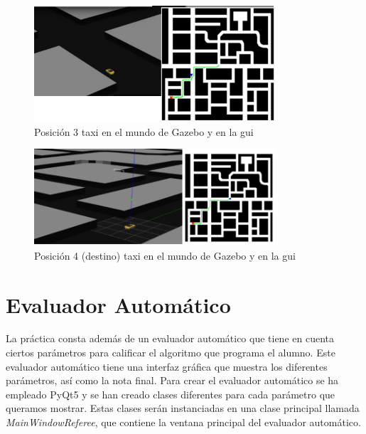 \begin{figure}[H]
  \begin{center}
    \includegraphics[width=0.8\textwidth]{figures/GPP/camino3_G.png}
		\caption{Posición 3 taxi en el mundo de Gazebo y en la \acrshort{gui}}
		\label{fig.camino3_G_gpp}
		\end{center}
\end{figure}

\begin{figure}[H]
  \begin{center}
    \includegraphics[width=0.8\textwidth]{figures/GPP/camino1_G.png}
		\caption{Posición 4 (destino) taxi en el mundo de Gazebo y en la \acrshort{gui}}
		\label{fig.camino4_G_gpp}
		\end{center}
\end{figure}

\section{Evaluador Automático}
La práctica consta además de un evaluador automático que tiene en cuenta ciertos parámetros para calificar el algoritmo que programa el alumno. Este evaluador automático tiene una interfaz gráfica que muestra los diferentes parámetros, así como la nota final. Para crear el evaluador automático se ha empleado PyQt5 y se han creado clases diferentes para cada parámetro que queramos mostrar. Estas clases serán instanciadas en una clase principal llamada \textit{MainWindowReferee}, que contiene la ventana principal del evaluador automático.\\

